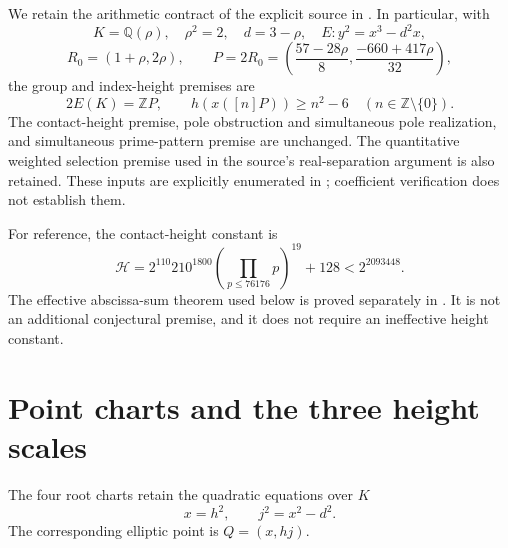 \documentclass[11pt,a4paper]{article}
\theoremstyle{remark}\newtheorem{remark}[theorem]{Remark}
\newcommand{\Q}{\mathbb Q}\newcommand{\Z}{\mathbb Z}
\newcommand{\HH}{\mathcal H}
\begin{document}
We retain the arithmetic contract of the explicit source in
\cite[Section 2]{Quartic392}. In particular, with
\[
 K=\Q(\rho),\quad\rho^2=2,\quad d=3-\rho,\quad
 E:y^2=x^3-d^2x,
\]
\[
 R_0=(1+\rho,2\rho),\qquad
 P=2R_0=\left(\frac{57-28\rho}{8},
                \frac{-660+417\rho}{32}\right),
\]
the group and index-height premises are
\begin{equation}\label{eq:group}
 2E(K)=\Z P,\qquad h(x([n]P))\ge n^2-6\quad(n\in\Z\setminus\{0\}).
\end{equation}
The contact-height premise, pole obstruction and simultaneous pole
realization, and simultaneous prime-pattern premise are unchanged.
The quantitative weighted selection premise used in the source's
real-separation argument is also retained. These inputs are explicitly
enumerated in \cite[Section 2]{Quartic392}; coefficient verification
does not establish them.

For reference, the contact-height constant is
\begin{equation}\label{eq:H}
 \HH=2^{110}210^{1800}
          \left(\prod_{p\le76176}p\right)^{19}+128
       <2^{2093448}.
\end{equation}
The effective abscissa-sum theorem used below is proved separately
in \cite{EffectiveSums}. It is not an additional conjectural premise,
and it does not require an ineffective height constant.

\section{Point charts and the three height scales}

The four root charts retain the quadratic equations over $K$
\begin{equation}\label{eq:chart}
                         x=h^2,\qquad j^2=x^2-d^2.
\end{equation}
The corresponding elliptic point is $Q=(x,hj)$.
\end{document}
